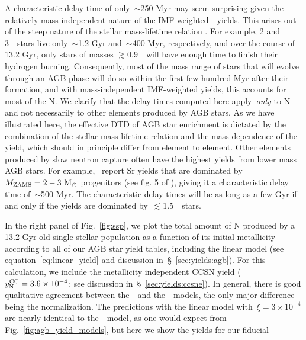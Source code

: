 \documentclass[ms.tex]{subfiles}
\begin{document}
A characteristic delay time of only~$\sim$250 Myr may seem surprising given
the relatively mass-independent nature of the IMF-weighted~\cristallo~yields.
This arises out of the steep nature of the stellar mass-lifetime relation
\citep[e.g.][]{Larson1974, Maeder1989, Padovani1993}.
For example, 2 and 3~\msun~stars live only~$\sim$1.2 Gyr and~$\sim$400 Myr,
respectively, and over the course of 13.2 Gyr, only stars of masses
$\gtrsim$0.9~\msun~will have enough time to finish their hydrogen burning.
Consequently, most of the mass range of stars that will evolve through an
AGB phase will do so within the first few hundred Myr after their formation,
and with mass-independent IMF-weighted yields, this accounts for most of the
N.
We clarify that the delay times computed here apply~\textit{only} to N and
not necessarily to other elements produced by AGB stars.
As we have illustrated here, the effective DTD of AGB star enrichment is
dictated by the combination of the stellar mass-lifetime relation and the
mass dependence of the yield, which should in principle differ from element to
element.
Other elements produced by slow neutron capture often have the highest yields
from lower mass AGB stars.
For example,~\citet{Cristallo2011, Cristallo2015} report Sr yields that are
dominated by~$M_\text{ZAMS} = 2 - 3~\text{M}_\odot$ progenitors (see fig. 5 of
\citealp{Johnson2020}), giving it a characteristic delay time of~$\sim$500 Myr.
The characteristic delay-times will be as long as a few Gyr if and only if the
yields are dominated by~$\lesssim$1.5~\msun~stars.
\par
In the right panel of Fig.~\ref{fig:ssp}, we plot the total amount of N
produced by a 13.2 Gyr old single stellar population as a function of its
initial metallicity according to all of our AGB star yield tables, including
the linear model (see equation~\ref{eq:linear_yield} and discussion
in~\S~\ref{sec:yields:agb}).
For this calculation, we include the metallicity independent CCSN yield
($y_\text{N}^\text{CC} = 3.6\times10^{-4}$; see discussion in~\S~\ref{sec:yields:ccsne}).
In general, there is good qualitative agreement between the~\cristallo~and
the~\ventura~models, the only major difference being the normalization.
The predictions with the linear model with~$\xi = 3\times10^{-4}$ are nearly
identical to the~\cristallo~model, as one would expect from
Fig.~\ref{fig:agb_yield_models}, but here we show the yields for our fiducial
\end{document}
